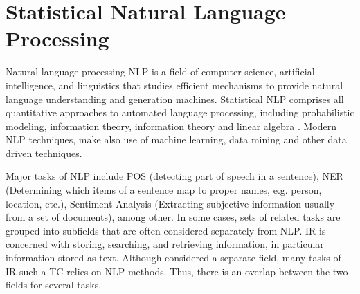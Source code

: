      

\section{Statistical Natural Language Processing}
\label{sec:rel_nlp}
Natural language processing \ac{NLP} is a field of computer science,
artificial intelligence, and linguistics that studies efficient mechanisms to
provide natural language understanding and generation  machines. 
Statistical \ac{NLP} comprises all quantitative approaches to automated
language processing, including probabilistic modeling, information theory,
information theory and linear algebra \cite{Manning:1999:FSN:311445}.  Modern
\ac{NLP}  techniques,  make also use of  machine learning, data mining  and other data
driven techniques.

Major tasks of \ac{NLP} include  \ac{POS} (detecting part of speech in a
sentence), \ac{NER}  (Determining which items of a sentence map to proper
names, e.g. person, location, etc.),   Sentiment Analysis (Extracting
subjective information usually from a set of documents), among other. 
In some cases, sets of related tasks are grouped into subfields that are often
considered separately from \ac{NLP}. \ac{IR} is concerned with storing,
searching, and retrieving information, in particular  information stored as
text. Although considered a separate field, many tasks of \ac{IR} such a
\ac{TC} relies on \ac{NLP} methods. Thus, there is an overlap between the two
fields for several tasks.



